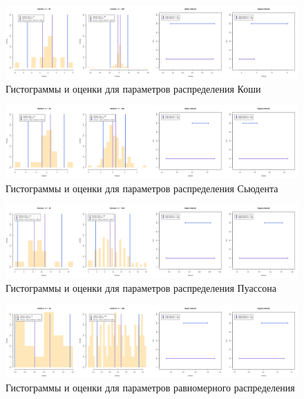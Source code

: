 \begin{figure}[H]
    \centering
    \includegraphics[width = 1\linewidth]{images/ranges/cauchy.png}
    \caption{Гистограммы и оценки для параметров распределения Коши}
    \label{fig12}
\end{figure}

\begin{figure}[H]
    \centering
    \includegraphics[width = 1\linewidth]{images/ranges/student.png}
    \caption{Гистограммы и оценки для параметров распределения Сьюдента}
    \label{fig13}
\end{figure}

\begin{figure}[H]
    \centering
    \includegraphics[width = 1\linewidth]{images/ranges/poisson.png}
    \caption{Гистограммы и оценки для параметров распределения Пуассона}
    \label{fig14}
\end{figure}

\begin{figure}[H]
    \centering
    \includegraphics[width = 1\linewidth]{images/ranges/uniform.png}
    \caption{Гистограммы и оценки для параметров равномерного распределения}
    \label{fig15}
\end{figure}
